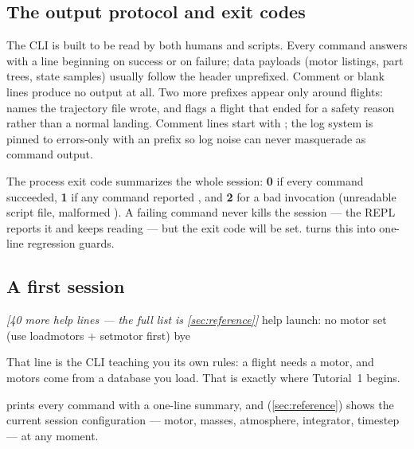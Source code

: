 \subsection{The output protocol and exit codes}\label{sec:protocol}

The CLI is built to be read by both humans and scripts. Every command answers
with a line beginning  on success or  on failure;
data payloads (motor listings, part trees, state samples) usually follow the
 header unprefixed. Comment or blank lines produce no output at all.
Two more prefixes appear only around flights:
 names the trajectory file  wrote, and
 flags a flight that ended for a safety reason
rather than a normal landing. Comment lines start with \code{\#}; the log
system is pinned to errors-only with an \code{[ERROR]} prefix so log noise can
never masquerade as command output.

The process exit code summarizes the whole session: \textbf{0} if every command
succeeded, \textbf{1} if any command reported , and \textbf{2} for a
bad invocation (unreadable script file, malformed ). A failing
command never kills the session --- the REPL reports it and keeps reading ---
but the exit code will be set.  turns this into one-line
regression guards.

\subsection{A first session}

\begin{console}
\textcolor{qrGray}{\textit{[40 more help lines --- the full list is \cref{sec:reference}]}}
\ok help
\err launch: no motor set (use loadmotors + setmotor first)
\ok bye
\end{console}

That \err{} line is the CLI teaching you its own rules: a flight needs a motor,
and motors come from a database you load. That is exactly where
Tutorial~1 begins.

\begin{tip}
 prints every command with a one-line summary, and 
(\cref{sec:reference}) shows the current session configuration --- motor,
masses, atmosphere, integrator, timestep --- at any moment.
\end{tip}
